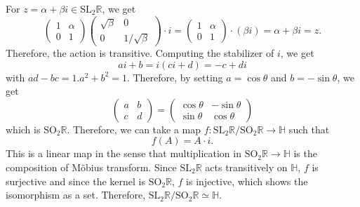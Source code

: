 \documentclass[a4paper, 12pt]{article}
\theoremstyle{Mydefinition}
\theoremstyle{Mytheorem}
\begin{document}
\begin{enumerate}
    For $z=\alpha+\beta i\in \mathrm{SL}_2\mathbb{R}$, we get
    \begin{equation}
        \begin{pmatrix}
            1 & \alpha\\
            0 & 1
        \end{pmatrix}
        \begin{pmatrix}
            \sqrt{\beta} & 0\\
            0 & 1/\sqrt{\beta}
        \end{pmatrix}
        \cdot i = \begin{pmatrix}
            1 & \alpha\\
            0 & 1
        \end{pmatrix}\cdot (\beta i) = \alpha + \beta i = z.
    \end{equation}
    Therefore, the action is transitive. Computing the stabilizer of $i$, we get
    \begin{equation}
        ai+b = i(ci+d) = -c+di
    \end{equation}
    with $ad-bc = 1$.$a^2+b^2 = 1$. Therefore, by setting $a=\cos\theta$ and $b=-\sin\theta$, we get
    \begin{equation}
        \begin{pmatrix}
            a & b\\
            c & d
        \end{pmatrix} =\begin{pmatrix}
            \cos\theta & -\sin \theta\\
            \sin\theta & \cos\theta
        \end{pmatrix}
    \end{equation}
    which is $\textrm{SO}_2\mathbb{R}$. Therefore, we can take a map $f:\mathrm{SL}_2\mathbb{R}/\mathrm{SO}_2\mathbb{R}\rightarrow \mathbb{H}$ such that
    \begin{equation}
        f(A) = A\cdot i.
    \end{equation}
    This is a linear map in the sense that multiplication in $\mathrm{SO}_2\mathbb{R}\rightarrow \mathbb{H}$ is the composition of M\"obius transform. Since $\mathrm{SL}_2\mathbb{R}$ acts transitively on $\mathbb{H}$, $f$ is surjective and since the kernel is $\mathrm{SO}_2\mathbb{R}$, $f$ is injective, which shows the isomorphism as a set. Therefore, $\mathrm{SL}_2\mathbb{R}/\mathrm{SO}_2\mathbb{R}\simeq \mathbb{H}$.
    

\end{enumerate}
\end{document}
